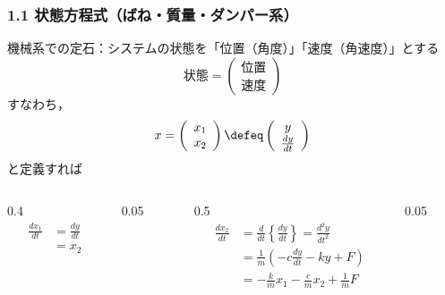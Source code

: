 \begin{frame}[t]
\frametitle{1.1 状態方程式（ばね・質量・ダンパー系）}
機械系での定石：システムの状態を「位置（角度）」「速度（角速度）」とする
\[
 \mbox{状態} =
 \left(\begin{array}{c}
         \mbox{位置}\\
   \mbox{速度}
       \end{array}\right)
\]
すなわち，
\begin{gather}
 x = \left(\begin{array}{c}
            x_1 \\
      x_2
     \end{array}\right)
 \defeq
 \left(\begin{array}{c}
         y \\
  \frac{dy}{dt}
       \end{array}\right)
\end{gather}
と定義すれば
\begin{columns}[t]
\begin{column}{0.4\textwidth}
\begin{align}
  \frac{dx_1}{dt} &= \frac{dy}{dt} \nonumber \\
                  &= x_2
\end{align}
\end{column}
\begin{column}{0.05\textwidth}

\end{column}
\begin{column}{0.5\textwidth}
\begin{align}
  \frac{dx_2}{dt} &= \frac{d}{dt} \left\{\frac{dy}{dt} \right\}
       = \frac{d^2 y}{dt^2} \nonumber \\
      &= \frac{1}{m} (-c \frac{dy}{dt} -k y + F) \nonumber \\
      &= -\frac{k}{m} x_1 - \frac{c}{m} x_2 + \frac{1}{m} F
\end{align}
\end{column}
\begin{column}{0.05\textwidth}

\end{column}
\end{columns}

\end{frame}

